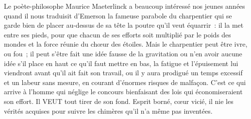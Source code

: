 \documentclass[french,twoside]{book} %
\begin{document}
Le poète-philosophe Maurice Maeterlinck a beaucoup intéressé nos jeunes années quand il nous traduisit d’Emerson la fameuse parabole du charpentier qui se garde bien de placer au-dessus de sa tête la poutre qu’il veut équarrir : il la met entre ses pieds, pour que chacun de ses efforts soit multiplié par le poids des mondes et la force réunie du chœur des étoiles. Mais le charpentier peut être ivre, ou fou ; il peut s’être fait une idée fausse de la gravitation ou n’en avoir aucune idée s’il place en haut ce qu’il faut mettre en bas, la fatigue et l’épuisement lui viendront avant qu’il ait fait son travail, ou il y aura prodigué un temps excessif et un labeur sans mesure, en courant d’énormes risques de malfaçon. C’est ce qui arrive à l’homme qui néglige le concours bienfaisant des lois qui économiseraient son effort. Il VEUT tout tirer de son fond. Esprit borné, cœur vicié, il nie les vérités acquises pour suivre les chimères qu’il n’a même pas inventées.\par
\end{document}
